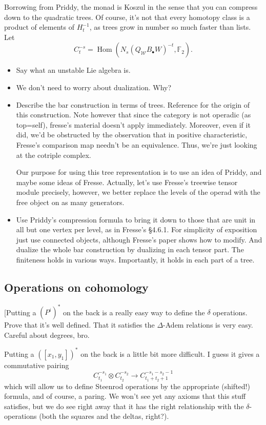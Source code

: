 \documentclass[11pt]{amsart}
\theoremstyle{plain}
\theoremstyle{definition}
\DeclareMathOperator{\Hom}{Hom}
\renewcommand{\to}{\longrightarrow}
\newcommand{\squishlist}{
  \setlength{\itemsep}{.5pt}
  \setlength{\parskip}{0pt}
  \setlength{\parsep}{0pt}}
\newcommand{\calW}{\mathcal{W}}
\theoremstyle{plain}
\newcommand{\F}{\mathbb{F}}
\begin{document}
Borrowing from Priddy, the monad is Koszul in the sense that you can compress down to the quadratic trees. Of course, it's not that every homotopy class is a product of elements of $H^{-1}_t$, as trees grow in number so much faster than lists.
Let
\[C^{-s}_{t}=\Hom(N_s(Q_\calW B_{\bullet}W)^{-t},\F_2).\]



{\tiny
\begin{itemize}\squishlist
\setlength{\parindent}{.25in}
\item Say what an unstable Lie algebra is.
\item We don't need to worry about dualization. Why?
\item Describe the bar construction in terms of trees. Reference \cite{FresseKoszulDuality.pdf} for the origin of this construction. Note however that since the category is not operadic (as top=self), fresse's material doesn't apply immediately. Moreover, even if it did, we'd be obstructed by the observation that in positive characteristic, Fresse's comparison map needn't be an equivalence. Thus, we're just looking at the cotriple complex.

Our purpose for using this tree representation is to use an idea of Priddy, and maybe some ideas of Fresse. Actually, let's use Fresse's treewise tensor module precisely, however, we better replace the levels of the operad with the free object on as many generators.
\item Use Priddy's compression formula to bring it down to those that are unit in all but one vertex per level, as in Fresse's \S4.6.1. For simplicity of exposition just use connected objects, although Fresse's paper \cite{FresseSimplicialAlgs.pdf} shows how to modify. And dualize the whole bar construction by dualizing in each tensor part. The finiteness holds in various ways. Importantly, it holds in each part of a tree.
\end{itemize}}
\subsection{Operations on cohomology}
[Putting a $(P^i)^*$ on the back is a really easy way to define the $\delta$ operations. Prove that it's well defined. That it satisfies the $\Delta$-Adem relations is very easy. Careful about degrees, bro.

Putting a $([x_1,y_1])^*$ on the back is a little bit more difficult. I guess it gives a commutative pairing 
\[C_{t_1}^{-s_1}\otimes C_{t_2}^{-s_2}\to C_{t_1+t_2+1}^{-s_1-s_2-1}\]
which will allow us to define Steenrod operations by the appropriate (shifted!) formula, and of course, a paring. We won't see yet any axioms that this stuff satisfies, but we do see right away that it has the right relationship with the $\delta$-operations (both the squares and the deltas, right?).
\end{document}
